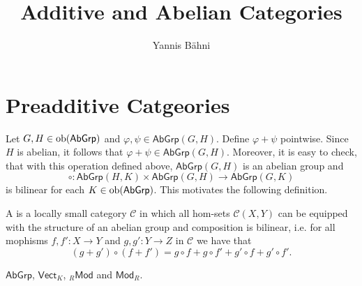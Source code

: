 

\title{Additive and Abelian Categories}
\author{Yannis B\"{a}hni}
\address[Yannis B\"{a}hni]{University of Zurich, R\"{a}mistrasse 71, 8006 Zurich}



\begin{abstract}
\end{abstract}

\maketitle

\tableofcontents

\section{Preadditive Catgeories}
Let $G,H \in \operatorname{ob}(\mathsf{AbGrp})$ and $\varphi,\psi \in \mathsf{AbGrp}(G,H)$. Define $\varphi + \psi$ pointwise. Since $H$ is abelian, it follows that $\varphi + \psi \in \mathsf{AbGrp}(G,H)$. Moreover, it is easy to check, that with this operation defined above, $\mathsf{AbGrp}(G,H)$ is an abelian group and 
\begin{equation*}
	\circ : \mathsf{AbGrp}(H,K) \times \mathsf{AbGrp}(G,H) \to \mathsf{AbGrp}(G,K)
\end{equation*}
\noindent is bilinear for each $K \in \operatorname{ob}(\mathsf{AbGrp})$. This motivates the following definition. 

\begin{definition}
	A  is a locally small category $\mathcal{C}$ in which all hom-sets $\mathcal{C}(X,Y)$ can be equipped with the structure of an abelian group and composition is bilinear, i.e. for all mophisms $f,f' : X \to Y$ and $g,g' : Y \to Z$ in $\mathcal{C}$ we have that
	\begin{equation}
		(g + g') \circ (f + f') = g \circ f + g \circ f' + g' \circ f + g' \circ f'.
	\end{equation}
\end{definition}

\begin{examples}
	$\mathsf{AbGrp}$, $\mathsf{Vect}_K$, $_{R}\mathsf{Mod}$ and $\mathsf{Mod}_R$.	
\end{examples}

